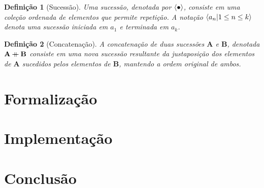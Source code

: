 \documentclass{report}
\newcommand\mdoubleplus{\mathbin{+\mkern-10mu+}}
\newtheorem{definition}{Definição}
\begin{document}
    \begin{definition}[Sucessão]
        Uma sucessão, denotada por $\langle\bullet\rangle$, consiste em uma coleção ordenada de elementos que permite repetição. A notação $\langle a_n | 1 \leq n \leq k\rangle$ denota uma sucessão iniciada em $a_1$ e terminada em $a_k$. 
    \end{definition}

    \begin{definition}[Concatenação]
        A concatenação de duas sucessões $\mathbf{A}$ e $\mathbf{B}$, denotada $\mathbf{A} \mdoubleplus \mathbf{B}$ consiste em uma nova sucessão resultante da justaposição dos elementos de $\mathbf{A}$ sucedidos pelos elementos de $\mathbf{B}$, mantendo a ordem original de ambos.
    \end{definition}

    \chapter{Formalização}
    \chapter{Implementação}
    \chapter{Conclusão}

    
    
\end{document}
